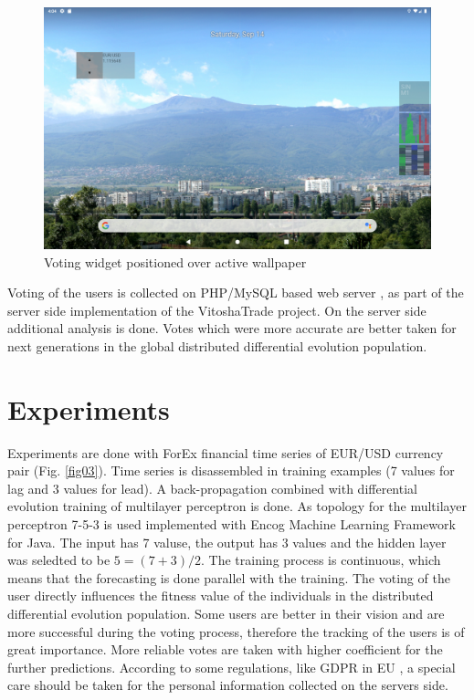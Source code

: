 \documentclass[runningheads]{llncs}
\begin{document}
\begin{figure}
\includegraphics[width=1.0\textwidth]{fig04a.png}
\centering
\caption{Voting widget positioned over active wallpaper} \label{fig04}
\end{figure}
\FloatBarrier

Voting of the users is collected on PHP/MySQL based web server \cite{tomov01}, as part of the server side implementation of the VitoshaTrade project. On the server side additional analysis is done. Votes which were more accurate are better taken for next generations in the global distributed differential evolution population. 

\section{Experiments} \label{Experiments}

Experiments are done with ForEx financial time series of EUR/USD currency pair (Fig. \ref{fig03}). Time series is disassembled in training examples (7 values for lag and 3 values for lead). A back-propagation combined with differential evolution training of multilayer perceptron is done. As topology for the multilayer perceptron 7-5-3 is used implemented with Encog Machine Learning Framework \cite{heaton01} for Java. The input has 7 valuse, the output has 3 values and the hidden layer was seledted to be $5 = (7 + 3) / 2$. The training process is continuous, which means that the forecasting is done parallel with the training. The voting of the user directly influences the fitness value of the individuals in the distributed differential evolution population. Some users are better in their vision and are more successful during the voting process, therefore the tracking of the users is of great importance. More reliable votes are taken with higher coefficient for the further predictions. According to some regulations, like GDPR in EU \cite{hristov01}, a special care should be taken for the personal information collected on the servers side. 
\end{document}
